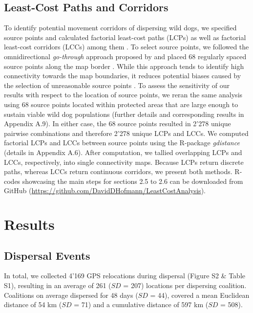 \documentclass[abstract=on,10pt,a4paper,bibliography=totocnumbered]{article}
\begin{document}
\subsection{Least-Cost Paths and Corridors}
To identify potential movement corridors of dispersing wild dogs, we specified
source points and calculated factorial least-cost paths (LCPs) as well as
factorial least-cost corridors (LCCs) among them \citep{Elliot.2014}. To select
source points, we followed the omnidirectional \textit{go-through} approach
proposed by \cite{Koen.2014} and placed 68 regularly spaced source points along
the map border \citep{Koen.2014, Pitman.2017}. While this approach tends to
identify high connectivity towards the map boundaries, it reduces potential
biases caused by the selection of unreasonable source points \citep{Koen.2014}.
To assess the sensitivity of our results with respect to the location of source
points, we reran the same analysis using 68 source points located within
protected areas that are large enough to sustain viable wild dog populations
(further details and corresponding results in Appendix A.9). In either case, the
68 source points resulted in 2'278 unique pairwise combinations and therefore
2'278 unique LCPs and LCCs. We computed factorial LCPs and LCCs between source
points using the R-package \textit{gdistance} (details in Appendix A.6). After
computation, we tallied overlapping LCPs and LCCs, respectively, into single
connectivity maps. Because LCPs return discrete paths, whereas LCCs return
continuous corridors, we present both methods. R-codes showcasing the main steps
for sections 2.5 to 2.6 can be downloaded from GitHub
(\url{https://github.com/DavidDHofmann/LeastCostAnalysis}).

\section{Results}
\subsection{Dispersal Events}
In total, we collected 4'169 GPS relocations during dispersal (Figure S2 \&
Table S1), resulting in an average of 261 (\(SD\) = 207) locations per
dispersing coalition. Coalitions on average dispersed for 48 days (\(SD\) = 44),
covered a mean Euclidean distance of 54 km (\(SD\) = 71) and a cumulative
distance of 597 km (\(SD\) = 508).
\end{document}
